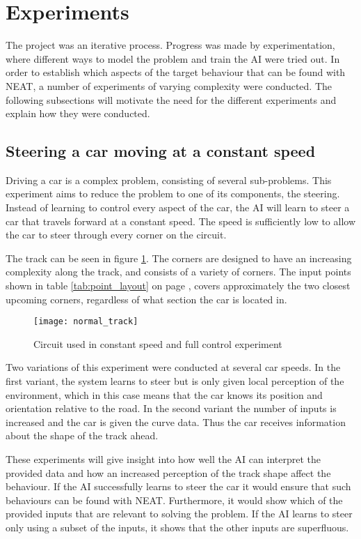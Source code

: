 \section{Experiments}
The project was an iterative process. Progress was made by experimentation, where different ways to model the problem and train the AI were tried out. In order to establish which aspects of the target behaviour that can be found with NEAT, a number of experiments of varying complexity were conducted. The following subsections will motivate the need for the different experiments and explain how they were conducted.

\subsection{Steering a car moving at a constant speed}
\label{method:constant_speed}
Driving a car is a complex problem, consisting of several sub-problems. This experiment aims to reduce the problem to one of its components, the steering. Instead of learning to control every aspect of the car, the AI will learn to steer a car that travels forward at a constant speed. The speed is sufficiently low to allow the car to steer through every corner on the circuit. 

The track can be seen in figure \ref{fig:normal_track}. The corners are designed to have an increasing complexity along the track, and consists of a variety of corners. The input points shown in table \ref{tab:point_layout} on page \pageref{tab:point_layout}, covers approximately the two closest upcoming corners, regardless of what section the car is located in.

\begin{figure}
\texttt{[image: normal\_track]}
\caption{Circuit used in constant speed and full control experiment}
\label{fig:normal_track}
\centering
\end{figure}

Two variations of this experiment were conducted at several car speeds. In the first variant, the system learns to steer but is only given local perception of the environment, which in this case means that the car knows its position and orientation relative to the road. In the second variant the number of inputs is increased and the car is given the curve data. Thus the car receives information about the shape of the track ahead.

These experiments will give insight into how well the AI can interpret the provided data and how an increased perception of the track shape affect the behaviour. If the AI successfully learns to steer the car it would ensure that such behaviours can be found with NEAT. Furthermore, it would show which of the provided inputs that are relevant to solving the problem. If the AI learns to steer only using a subset of the inputs, it shows that the other inputs are superfluous. 

